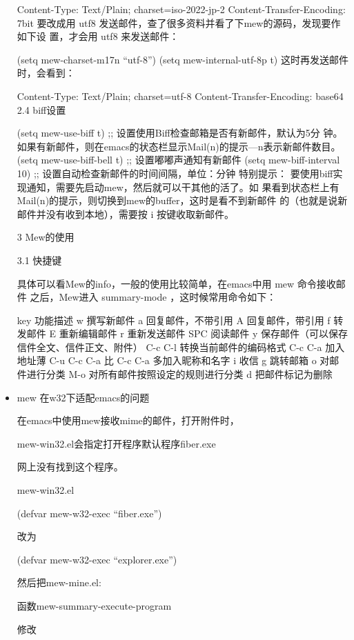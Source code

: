 \documentclass[11pt]{article}
\begin{document}
\begin{itemize}
Content-Type: Text/Plain; charset=iso-2022-jp-2
Content-Transfer-Encoding: 7bit
要改成用 utf8 发送邮件，查了很多资料并看了下mew的源码，发现要作如下设 置，才会用 utf8 来发送邮件：

(setq mew-charset-m17n ``utf-8'')
(setq mew-internal-utf-8p t)
这时再发送邮件时，会看到：

Content-Type: Text/Plain; charset=utf-8
Content-Transfer-Encoding: base64
2.4 biff设置

(setq mew-use-biff t)  ;; 设置使用Biff检查邮箱是否有新邮件，默认为5分
钟。如果有新邮件，则在emacs的状态栏显示Mail(n)的提示—n表示新邮件数目。
(setq mew-use-biff-bell t)  ;; 设置嘟嘟声通知有新邮件
(setq mew-biff-interval 10) ;; 设置自动检查新邮件的时间间隔，单位：分钟
特别提示： 要使用biff实现通知，需要先启动mew，然后就可以干其他的活了。如 果看到状态栏上有Mail(n)的提示，则切换到mew的buffer，这时是看不到新邮件 的（也就是说新邮件并没有收到本地），需要按 i 按键收取新邮件。

3 Mew的使用

3.1 快捷键

具体可以看Mew的info，一般的使用比较简单，在emacs中用 mew 命令接收邮件 之后，Mew进入 summary-mode ，这时候常用命令如下：

key     功能描述
w       撰写新邮件
a       回复邮件，不带引用
A       回复邮件，带引用
f       转发邮件
E       重新编辑邮件
r       重新发送邮件
SPC     阅读邮件
y       保存邮件（可以保存信件全文、信件正文、附件）
C-c C-l 转换当前邮件的编码格式
C-c C-a 加入地址薄
C-u C-c C-a     比 C-c C-a 多加入昵称和名字
i       收信
g       跳转邮箱
o       对邮件进行分类
M-o     对所有邮件按照设定的规则进行分类
d       把邮件标记为删除

\item mew 在w32下适配emacs的问题\\
\label{sec-2.1}

在emacs中使用mew接收mime的邮件，打开附件时，

mew-win32.el会指定打开程序默认程序fiber.exe

网上没有找到这个程序。

mew-win32.el

(defvar mew-w32-exec           ``fiber.exe'')

改为

(defvar mew-w32-exec           ``explorer.exe'')

然后把mew-mine.el:

函数mew-summary-execute-program

修改


\end{itemize}
\end{document}
